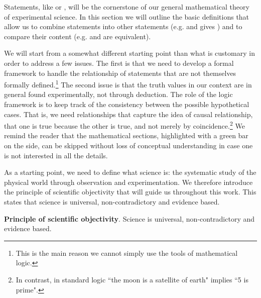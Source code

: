 \documentclass[11pt,letterpaper,fleqn]{memoir} %
\begin{document}
Statements, like  or , will be the cornerstone of our general mathematical theory of experimental science. In this section we will outline the basic definitions that allow us to combine statements into other statements (e.g.  and  gives ) and to compare their content (e.g.  and  are equivalent).

We will start from a somewhat different starting point than what is customary in order to address a few issues. The first is that we need to develop a formal framework to handle the relationship of statements that are not themselves formally defined.\footnote{This is the main reason we cannot simply use the tools of mathematical logic.} The second issue is that the truth values in our context are in general found experimentally, not through deduction. The role of the logic framework is to keep track of the consistency between the possible hypothetical cases. That is, we need relationships that capture the idea of causal relationship, that one is true because the other is true, and not merely by coincidence.\footnote{In contrast, in standard logic ``the moon is a satellite of earth" implies ``5 is prime".} We remind the reader that the mathematical sections, highlighted with a green bar on the side, can be skipped without loss of conceptual understanding in case one is not interested in all the details. 

As a starting point, we need to define what science is: the systematic study of the physical world through observation and experimentation. We therefore introduce the principle of scientific objectivity that will guide us throughout this work. This states that science is universal, non-contradictory and evidence based.

\begin{mathSection}
	\textbf{Principle of scientific objectivity}.
		Science is universal, non-contradictory and evidence based.
\end{mathSection}
\end{document}
